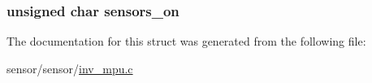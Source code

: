\subsubsection[{\texorpdfstring{sensors\+\_\+on}{sensors_on}}]{\setlength{\rightskip}{0pt plus 5cm}unsigned char sensors\+\_\+on}\hypertarget{structmotion__int__cache__s_a90574f8e8515ef8fee3114ba7e0ddc5c}{}\label{structmotion__int__cache__s_a90574f8e8515ef8fee3114ba7e0ddc5c}


The documentation for this struct was generated from the following file\+:\begin{DoxyCompactItemize}
\item 
sensor/sensor/\hyperlink{inv__mpu_8c}{inv\+\_\+mpu.\+c}\end{DoxyCompactItemize}
